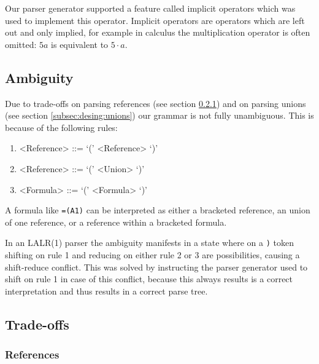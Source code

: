 \documentclass[conference]{IEEEtran}
\begin{document}
Our parser generator supported a feature called implicit operators which was used to implement this operator.
Implicit operators are operators which are left out and only implied, for example in calculus the multiplication operator is often omitted: $5a$ is equivalent to $5 \cdot a$.

\subsection{Ambiguity}
\label{sec:ambiguity}

Due to trade-offs on parsing references (see section \ref{tradeoff:references}) and on parsing unions (see section \ref{subsec:desing:unions}) our grammar is not fully unambiguous.
This is because of the following rules:
\begin{enumerate}
\item \begin{grammar}<Reference> ::= `(' <Reference> `)'\end{grammar}
\item \begin{grammar}<Reference> ::= `(' <Union> `)'\end{grammar}
\item \begin{grammar}<Formula> ::= `(' <Formula> `)'\end{grammar}
\end{enumerate}

A formula like \texttt{=(A1)} can be interpreted as either a bracketed reference, an union of one reference, or a reference within a bracketed formula.

In an LALR(1) parser the ambiguity manifests in a state where on a \texttt{)} token shifting on rule 1 and reducing on either rule 2 or 3 are possibilities, causing a shift-reduce conflict.
This was solved by instructing the parser generator used to shift on rule 1 in case of this conflict, because this always results is a correct interpretation and thus results in a correct parse tree.

\subsection{Trade-offs}

\subsubsection{\textbf{References}}
\label{tradeoff:references}
\end{document}
